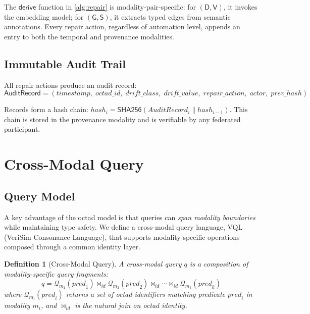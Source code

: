 \documentclass[11pt,twocolumn]{article}
\newtheorem{definition}{Definition}[section]
\newcommand{\queryfn}{\mathcal{Q}}
\begin{document}
The $\mathsf{derive}$ function in \cref{alg:repair} is modality-pair-specific:
for $(\mathsf{D}, \mathsf{V})$, it invokes the embedding model; for
$(\mathsf{G}, \mathsf{S})$, it extracts typed edges from semantic annotations.
Every repair action, regardless of automation level, appends an entry to both
the temporal and provenance modalities.

\subsection{Immutable Audit Trail}

All repair actions produce an audit record:
\[
  \mathsf{AuditRecord} = (
    \mathit{timestamp},\;
    \mathit{octad\_id},\;
    \mathit{drift\_class},\;
    \mathit{drift\_value},\;
    \mathit{repair\_action},\;
    \mathit{actor},\;
    \mathit{prev\_hash}
  )
\]

Records form a hash chain: $\mathit{hash}_i = \mathsf{SHA256}(
\mathit{AuditRecord}_i \| \mathit{hash}_{i-1})$.  This chain is stored in
the provenance modality and is verifiable by any federated participant.

\section{Cross-Modal Query}\label{sec:query}

\subsection{Query Model}

A key advantage of the octad model is that queries can \emph{span modality
boundaries} while maintaining type safety.  We define a cross-modal query
language, VQL (VeriSim Consonance Language), that supports modality-specific
operations composed through a common identity layer.

\begin{definition}[Cross-Modal Query]\label{def:query}
A \emph{cross-modal query} $q$ is a composition of modality-specific
query fragments:
\[
  q = \queryfn_{m_1}(\mathit{pred}_1) \bowtie_{\mathit{id}}
      \queryfn_{m_2}(\mathit{pred}_2) \bowtie_{\mathit{id}} \cdots
      \bowtie_{\mathit{id}} \queryfn_{m_k}(\mathit{pred}_k)
\]
where $\queryfn_{m_i}(\mathit{pred}_i)$ returns a set of octad identifiers
matching predicate $\mathit{pred}_i$ in modality $m_i$, and
$\bowtie_{\mathit{id}}$ is the natural join on octad identity.
\end{definition}
\end{document}
